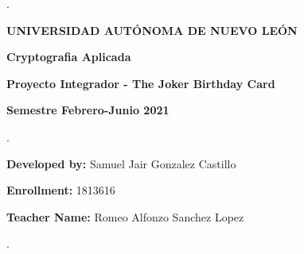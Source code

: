 \documentclass[a4paper, table,12pt,xcdraw]{article} %
\newcommand{\fondoa}{Images/fondo2.png}
\newcommand{\logoUNI}{Images/UanlLogo.png}
\newcommand{\logoFACU}{Images/FcfmLogo.png}
\newcommand{\materia}{Cryptografia Aplicada}
\newcommand{\teacher}{Romeo Alfonzo Sanchez Lopez}
\newcommand{\semestre}{Semestre Febrero-Junio 2021}
\begin{document}
	\begin{titlepage}
	\thispagestyle{empty}
	\BgThispage
	\centering
	\renewcommand{\headrulewidth}{0pt} %


	\textcolor{black}{.}
	\par\vspace{5.5cm}
	{\huge\scshape\textbf{UNIVERSIDAD AUTÓNOMA DE NUEVO LEÓN}}

	\par\vspace{2.5cm}
	{\LARGE\bfseries{\materia}}

	\par\vspace{1.5cm}
	{\large\bfseries{Proyecto Integrador - The Joker Birthday Card}}
	\par\vspace{1.5cm}

	{\Large\bfseries{\semestre}}


	\par\vspace{4cm}

	\thispagestyle{fancy}

	\begin{tcolorbox}[colback=white!5!white,colframe=black!75!black]
		.
		\par
		\Large{\textbf{Developed by:}\hspace{1cm} Samuel Jair Gonzalez Castillo}
		\par
		\Large{\textbf{Enrollment:}\hspace{1.7cm}   1813616}
		\par
		\Large{\textbf{Teacher Name:}\hspace{0.73cm} \teacher}
		\par
		.
	\end{tcolorbox}
	\end{titlepage}
	\newpage
	\BgThispage
	\clearpage
	\tableofcontents
	\clearpage


	\newpage
	\BgThispage
\end{document}
